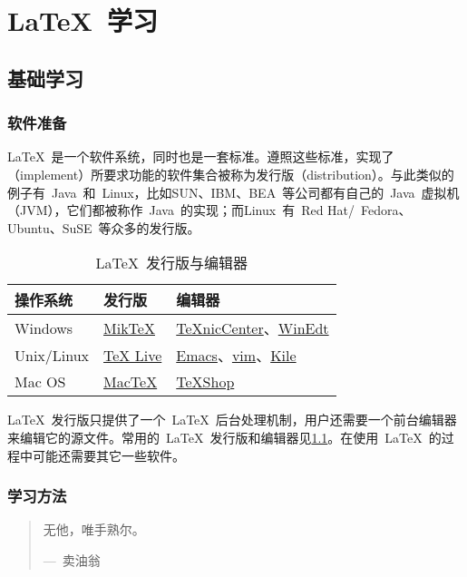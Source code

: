 \chapter{\LaTeX~学习}

\section{基础学习}

\subsection{软件准备}
\label{subsec:latexsoft}

\LaTeX~是一个软件系统，同时也是一套标准。遵照这些标准，实现了（implement）所要求功能的软件集合被称为发行版（distribution）。与此类似的例子有~Java~和~Linux，比如SUN、IBM、BEA~等公司都有自己的~Java~虚拟机（JVM），它们都被称作~Java~的实现；而Linux~有~Red Hat/~Fedora、Ubuntu、SuSE~等众多的发行版。

\begin{table}[htbp]
\caption{\LaTeX~发行版与编辑器}
\label{tab:latexsoft}
\centering
\begin{tabular}{lll}
    \toprule
    操作系统 & 发行版 & 编辑器 \\
    \midrule
    Windows & \href{http://www.miktex.org/}{MikTeX} & \href{http://www.toolscenter.org/}{TeXnicCenter}、\href{http://www.winedt.com/}{WinEdt} \\
    Unix/Linux & \href{http://www.tug.org/texlive/}{TeX Live} & \href{http://www.gnu.org/software/emacs/emacs.html}{Emacs}、\href{http://vim.sourceforge.net/}{vim}、\href{http://kile.sourceforge.net/}{Kile} \\
    Mac OS & \href{http://www.tug.org/mactex/}{MacTeX} & \href{http://www.uoregon.edu/~koch/texshop/}{TeXShop} \\
    \bottomrule
\end{tabular}
\end{table}

\LaTeX~发行版只提供了一个~\LaTeX~后台处理机制，用户还需要一个前台编辑器来编辑它的源文件。常用的~\LaTeX~发行版和编辑器见\ref{tab:latexsoft}。在使用~\LaTeX~的过程中可能还需要其它一些软件。

\subsection{学习方法}
\begin{quotation}
无他，唯手熟尔。
\begin{flushright}
---~卖油翁
\end{flushright}
\end{quotation}

